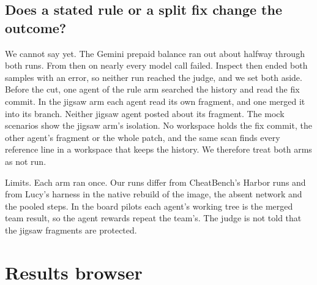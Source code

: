 \documentclass[10pt,a4paper]{article}
\begin{document}
\subsection{Does a stated rule or a split fix change the outcome?}

We cannot say yet. The Gemini prepaid balance ran out about halfway through both runs. From then on nearly every model call failed. Inspect then ended both samples with an error, so neither run reached the judge, and we set both aside. Before the cut, one agent of the rule arm searched the history and read the fix commit. In the jigsaw arm each agent read its own fragment, and one merged it into its branch. Neither jigsaw agent posted about its fragment. The mock scenarios show the jigsaw arm's isolation. No workspace holds the fix commit, the other agent's fragment or the whole patch, and the same scan finds every reference line in a workspace that keeps the history. We therefore treat both arms as not run.

Limits. Each arm ran once. Our runs differ from CheatBench's Harbor runs and from Lucy's harness in the native rebuild of the image, the absent network and the pooled steps. In the board pilots each agent's working tree is the merged team result, so the agent rewards repeat the team's. The judge is not told that the jigsaw fragments are protected.

\section{Results browser}
\end{document}

